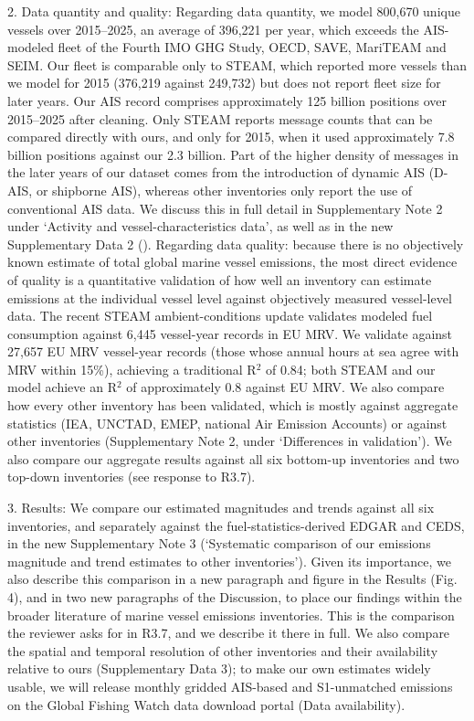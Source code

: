 \documentclass[11pt]{article}
\begin{document}
2. Data quantity and quality: Regarding data quantity, we model 800,670 unique vessels over 2015--2025, an average of 396,221 per year, which exceeds the AIS-modeled fleet of the Fourth IMO GHG Study, OECD, SAVE, MariTEAM and SEIM. Our fleet is comparable only to STEAM, which reported more vessels than we model for 2015 (376,219 against 249,732) but does not report fleet size for later years. Our AIS record comprises approximately 125 billion positions over 2015--2025 after cleaning. Only STEAM reports message counts that can be compared directly with ours, and only for 2015, when it used approximately 7.8 billion positions against our 2.3 billion. Part of the higher density of messages in the later years of our dataset comes from the introduction of dynamic AIS (D-AIS, or shipborne AIS), whereas other inventories only report the use of conventional AIS data. We discuss this in full detail in Supplementary Note 2 under `Activity and vessel-characteristics data', as well as in the new Supplementary Data 2 (). Regarding data quality: because there is no objectively known estimate of total global marine vessel emissions, the most direct evidence of quality is a quantitative validation of how well an inventory can estimate emissions at the individual vessel level against objectively measured vessel-level data. The recent STEAM ambient-conditions update validates modeled fuel consumption against 6,445 vessel-year records in EU MRV. We validate against 27,657 EU MRV vessel-year records (those whose annual hours at sea agree with MRV within 15\%), achieving a traditional R$^{2}$ of 0.84; both STEAM and our model achieve an R$^{2}$ of approximately 0.8 against EU MRV. We also compare how every other inventory has been validated, which is mostly against aggregate statistics (IEA, UNCTAD, EMEP, national Air Emission Accounts) or against other inventories (Supplementary Note 2, under `Differences in validation'). We also compare our aggregate results against all six bottom-up inventories and two top-down inventories (see response to R3.7).

3. Results: We compare our estimated magnitudes and trends against all six inventories, and separately against the fuel-statistics-derived EDGAR and CEDS, in the new Supplementary Note 3 (`Systematic comparison of our emissions magnitude and trend estimates to other inventories'). Given its importance, we also describe this comparison in a new paragraph and figure in the Results (Fig. 4), and in two new paragraphs of the Discussion, to place our findings within the broader literature of marine vessel emissions inventories. This is the comparison the reviewer asks for in R3.7, and we describe it there in full. We also compare the spatial and temporal resolution of other inventories and their availability relative to ours (Supplementary Data 3); to make our own estimates widely usable, we will release monthly gridded AIS-based and S1-unmatched emissions on the Global Fishing Watch data download portal (Data availability).
\end{document}
